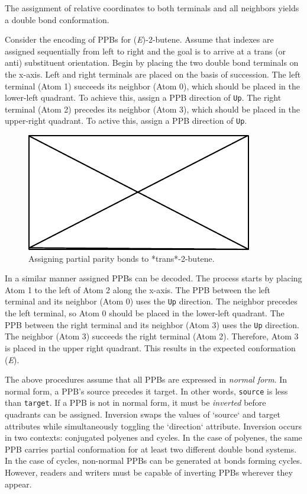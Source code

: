 \documentclass{article}
\def\ttt{\texttt}
\begin{document}
The assignment of relative coordinates to both terminals and all neighbors yields a double bond conformation.

Consider the encoding of PPBs for (\textit{E})-2-butene. Assume that indexes are assigned sequentially from left to right and the goal is to arrive at a trans (or anti) substituent orientation. Begin by placing the two double bond terminals on the x-axis. Left and right terminals are placed on the basis of succession. The left terminal (Atom 1) succeeds its neighbor (Atom 0), which should be placed in the lower-left quadrant. To achieve this, assign a PPB direction of \ttt{Up}. The right terminal (Atom 2) precedes its neighbor (Atom 3), which should be placed in the upper-right quadrant. To active this, assign a PPB direction of \ttt{Up}.

\begin{figure}
    \centering
    \includegraphics{filler}
    \caption{Assigning partial parity bonds to *trans*-2-butene.}
    \label{fig:assigning-ppb}
\end{figure}

In a similar manner assigned PPBs can be decoded. The process starts by placing Atom 1 to the left of Atom 2 along the x-axis. The PPB between the left terminal and its neighbor (Atom 0) uses the \ttt{Up} direction. The neighbor precedes the left terminal, so Atom 0 should be placed in the lower-left quadrant. The PPB between the right terminal and its neighbor (Atom 3) uses the \ttt{Up} direction. The neighbor (Atom 3) succeeds the right terminal (Atom 2). Therefore, Atom 3 is placed in the upper right quadrant. This results in the expected conformation (\textit{E}).

The above procedures assume that all PPBs are expressed in \textit{normal form}. In normal form, a PPB's source precedes it target. In other words, \ttt{source} is less than \ttt{target}. If a PPB is not in normal form, it must be \textit{inverted} before quadrants can be assigned. Inversion swaps the values of `source` and target attributes while simultaneously toggling the `direction` attribute. Inversion occurs in two contexts: conjugated polyenes and cycles. In the case of polyenes, the same PPB carries partial conformation for at least two different double bond systems. In the case of cycles, non-normal PPBs can be generated at bonds forming cycles. However, readers and writers must be capable of inverting PPBs wherever they appear.
\end{document}
